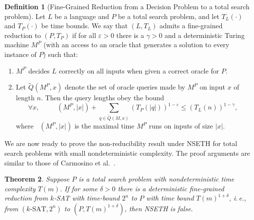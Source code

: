 \documentclass[11pt]{article}
\numberwithin{equation}{section}
\newtheorem{theorem}{Theorem}[section]
\theoremstyle{definition}
\newtheorem{definition}[theorem]{Definition}
\theoremstyle{plain}
\newcommand{\ie}{i.\,e.}
\theoremstyle{plain}
\newcommand{\NSETH}{NSETH\xspace}
\DeclareMathOperator{\THALT}{\mathsf{T_{HALT}}}
\newcommand\eps{\varepsilon}
\providecommand{\card}[1]{\lvert#1\rvert}
\begin{document}
\begin{definition}[Fine-Grained Reduction from a Decision Problem to a total search problem]
Let $L$ be a language and $P$ be a total search problem, and let $T_L(\cdot)$ and $T_P(\cdot)$ be time bounds. We say that $(L,T_L)$ admits a fine-grained reduction to $(P,T_P)$ if for all $\eps>0$ there is a $\gamma>0$ and a deterministic Turing machine $M^P$ (with an access to an oracle that generates a solution to every instance of $P$) such that:

\begin{enumerate}
\item \label{itit:a}
	$M^P$ decides $L$ correctly on all inputs when given a correct oracle for $P$.
\item \label{itit:b}
  Let %
$\widetilde{Q}(M^P,x)$    %
denote the set of oracle queries made by $M^P$ on input $x$ of length $n$. Then the query lengths obey the bound
%
$$
\forall x, \qquad
\THALT(M^P,\card{x}) + \sum_{q\in \widetilde{Q}(M,x)}(T_P(\card{q}))^{1-\varepsilon}
\leq(T_L(n))^{1-\gamma},
$$
where $\THALT(M^P,\card{x})$ is the maximal time $M^P$ runs on  inputs of size $\card{x}$.
\end{enumerate}
\end{definition}
We are now ready to prove the non-reducibility result under \NSETH for total search problems with small nondeterministic complexity. The proof
arguments are similar to those of Carmosino et al.~\cite{carmosino2016nondeterministic}.

\begin{theorem}\label{nondet:if}
Suppose $P$ is a total search problem with nondeterministic time complexity $T(m)$.
If for some $\delta>0$ there is a deterministic fine-grained reduction from $k$-SAT with time-bound $2^n$ to $P$ with time bound $T(m)^{1+\delta}$, \ie, from $(k\text{-SAT},2^n)$ to $(P,T(m)^{1+\delta})$, then \NSETH is false.
\end{theorem}
\end{document}
